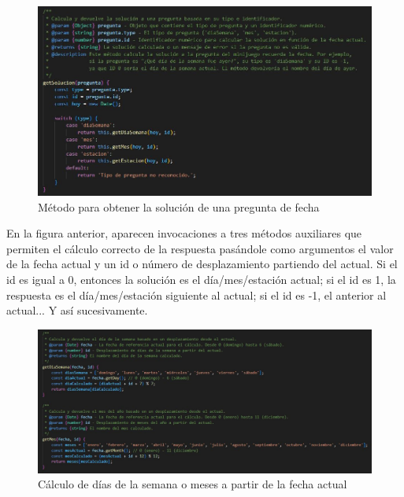 \begin{figure}[H]
	\centering
	\includegraphics{imgs/codigo-casillas-6.jpg}
	\caption{Método para obtener la solución de una pregunta de fecha}
	\label{fig:codigo-casillas-6}
\end{figure}

En la figura anterior, aparecen invocaciones a tres métodos auxiliares que permiten el cálculo correcto de la respuesta pasándole como argumentos el valor de la fecha actual y un id o número de desplazamiento partiendo del actual. Si el id es igual a 0, entonces la solución es el día/mes/estación actual; si el id es 1, la respuesta es el día/mes/estación siguiente al actual; si el id es -1, el anterior al actual... Y así sucesivamente. 

\begin{figure}[H]
	\centering
	\includegraphics[width=1\textwidth]{imgs/codigo-casillas-7.jpg}
	\caption{Cálculo de días de la semana o meses a partir de la fecha actual}
	\label{fig:codigo-casillas-7}
\end{figure}

